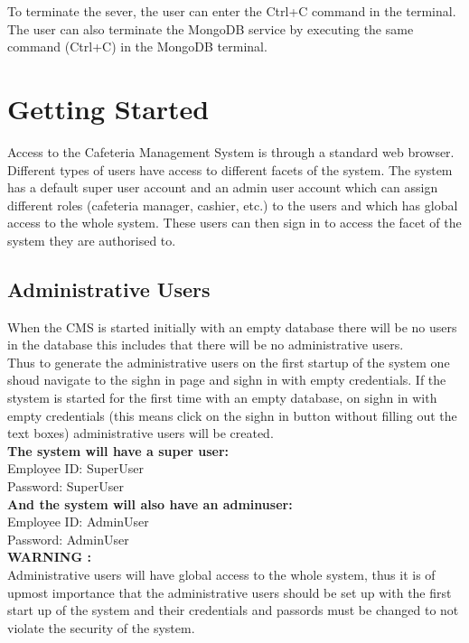 \documentclass[a4paper,12pt]{article}
\begin{document}
To terminate the sever, the user can enter the Ctrl+C command in the terminal. The user can also terminate the MongoDB service by executing the same command (Ctrl+C) in the MongoDB terminal.

\section{Getting Started}
Access to the Cafeteria Management System is through a standard web browser. Different types of users have access to different facets of the system. The system has a default super user account and an admin user account which can assign different roles (cafeteria manager, cashier, etc.) to the users and which has global access to the whole system. These users can then sign in to access the facet of the system they are authorised to.\\

\subsection{Administrative Users}
When the CMS is started initially with an empty database there will be no users in the database this includes that there will  be no administrative users.  \\
Thus to generate the administrative users on the first startup of the system one shoud navigate to the sighn in page and sighn in with empty credentials. If the stystem is started for the first time with an empty database, on sighn in with empty credentials (this means click on the sighn in button without filling out the text boxes) administrative users will be created. \\

\textbf{The system will have a super user:} \\
Employee ID: SuperUser \\
Password: SuperUser \\

\textbf{And the system will also have an adminuser:} \\
Employee ID: AdminUser \\
Password: AdminUser \\

\textbf{WARNING :} \\
Administrative users will have global access to the whole system, thus it is of upmost importance that the administrative users should be set up with the first start up of the system and their credentials and passords must be changed to not violate the security of the system. \\ 
\end{document}
